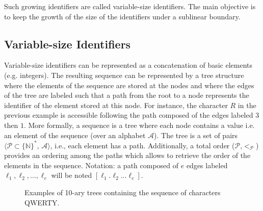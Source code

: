 Such growing identifiers are called variable-size identifiers. The main
objective is to keep the growth of the size of the identifiers under a sublinear
boundary.

\subsection{Variable-size Identifiers}
\label{subsec:variable}

Variable-size identifiers can be represented as a concatenation of basic
elements (e.g. integers). The resulting sequence can be represented by a tree
structure where the elements of the sequence are stored at the nodes and where
the edges of the tree are labeled such that a path from the root to a node
represents the identifier of the element stored at this node. For instance, the
character $R$ in the previous example is accessible following the path composed
of the edges labeled $3$ then $1$. More formally, a sequence is a tree where
each node contains a value i.e. an element of the sequence (over an alphabet
$\mathcal{A}$). The tree is a set of pairs
$\langle\mathcal{P}\subset\{\mathbb{N}\}^*,\, \mathcal{A} \rangle$, i.e., each
element has a path. Additionally, a total order
($\mathcal{P}$,$<_{\mathcal{P}}$) provides an ordering among the paths which
allows to retrieve the order of the elements in the sequence. Notation: a path
composed of $e$ edges labeled $\ell_1,\ell_2,\ldots,\ell_e$ will be noted
$[\ell_1.\ell_2\ldots\ell_e]$.

\begin{figure*}
  \centering
  \hspace{20pt}
  \caption{Examples of 10-ary trees containing the sequence of characters
    QWERTY.}
\end{figure*}


